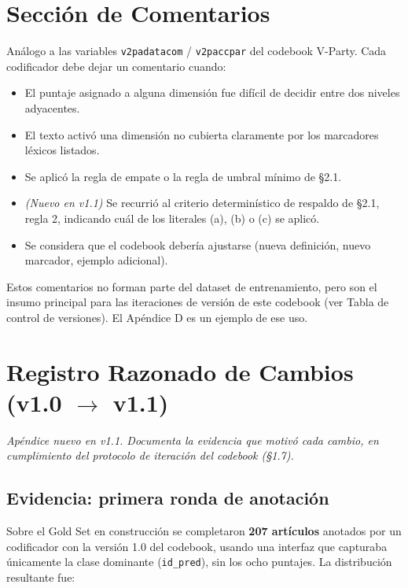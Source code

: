 \documentclass[11pt,letterpaper]{article}
\begin{document}
\section{Sección de Comentarios}
Análogo a las variables \texttt{v2padatacom} / \texttt{v2paccpar} del codebook V-Party. Cada codificador debe
dejar un comentario cuando:
\begin{itemize}
\item El puntaje asignado a alguna dimensión fue difícil de decidir entre dos niveles adyacentes.
\item El texto activó una dimensión no cubierta claramente por los marcadores léxicos listados.
\item Se aplicó la regla de empate o la regla de umbral mínimo de §2.1.
\item \emph{(Nuevo en v1.1)} Se recurrió al criterio determinístico de respaldo de §2.1, regla 2, indicando
cuál de los literales (a), (b) o (c) se aplicó.
\item Se considera que el codebook debería ajustarse (nueva definición, nuevo marcador, ejemplo adicional).
\end{itemize}
Estos comentarios no forman parte del dataset de entrenamiento, pero son el insumo principal para las
iteraciones de versión de este codebook (ver Tabla de control de versiones). El Apéndice D es un ejemplo de
ese uso.

\newpage
\section{Registro Razonado de Cambios (v1.0 $\rightarrow$ v1.1)}
\emph{Apéndice nuevo en v1.1. Documenta la evidencia que motivó cada cambio, en cumplimiento del
protocolo de iteración del codebook (§1.7).}

\subsection{Evidencia: primera ronda de anotación}
Sobre el Gold Set en construcción se completaron \textbf{207 artículos} anotados por un codificador con la
versión 1.0 del codebook, usando una interfaz que capturaba únicamente la clase dominante
(\texttt{id\_pred}), sin los ocho puntajes. La distribución resultante fue:
\end{document}
